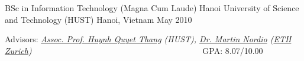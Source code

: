 \begin{cventries}
  \cventry
  { BSc in Information Technology (Magna Cum Laude)} %
  {Hanoi University of Science and Technology (HUST)} %
  {Hanoi, Vietnam} %
  {May 2010} %
  {
  	\begin{cvitems} %
	  	\item Advisors: {\em \href{http://www.soict.hut.edu.vn/~thanghq/}{Assoc. Prof. Huynh Quyet Thang}  (HUST), \href{http://se.inf.ethz.ch/people/nordio/}{Dr. Martin Nordio} (\href {http://se.inf.ethz.ch/}{ETH Zurich}) ~~~~~~~~~~~~~~~~~~~~~~~~~~~~~~~~~~~~~~~} GPA: 8.07/10.00 
  	\end{cvitems}
  }  

\end{cventries}




